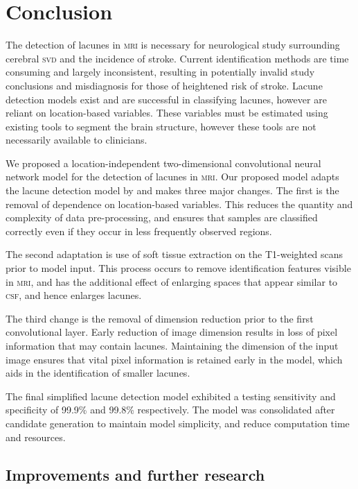 %
%

\chapter{Conclusion}\label{conclusion}

The detection of lacunes in \textsc{mri} is necessary for neurological study surrounding cerebral \textsc{svd} and the incidence of stroke. Current identification methods are time consuming and largely inconsistent, resulting in potentially invalid study conclusions and misdiagnosis for those of heightened risk of stroke. Lacune detection models exist and are successful in classifying lacunes, however are reliant on location-based variables. These variables must be estimated using existing tools to segment the brain structure, however these tools are not necessarily available to clinicians. 

We proposed a location-independent two-dimensional convolutional neural network model for the detection of lacunes in \textsc{mri}. Our proposed model adapts the lacune detection model by \cite{GhafoorianM.2017Dml3} and makes three major changes. The first is the removal of dependence on location-based variables. This reduces the quantity and complexity of data pre-processing, and ensures that samples are classified correctly even if they occur in less frequently observed regions.

The second adaptation is use of soft tissue extraction on the T1-weighted scans prior to model input. This process occurs to remove identification features visible in \textsc{mri}, and has the additional effect of enlarging spaces that appear similar to \textsc{csf}, and hence enlarges lacunes.

The third change is the removal of dimension reduction prior to the first convolutional layer. Early reduction of image dimension results in loss of pixel information that may contain lacunes. Maintaining the dimension of the input image ensures that vital pixel information is retained early in the model, which aids in the identification of smaller lacunes.

The final simplified lacune detection model exhibited a testing sensitivity and specificity of 99.9\% and 99.8\% respectively. The model was consolidated after candidate generation to maintain model simplicity, and reduce computation time and resources. 

\section{Improvements and further research}

